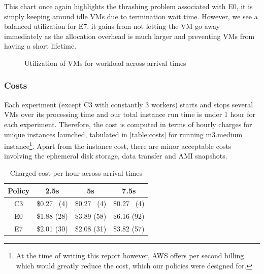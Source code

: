 \documentclass[a4paper]{IEEEtran}
\begin{document}
This chart once again highlights the thrashing problem associated with \textsc{E0}, it is simply keeping around idle VMs due to termination wait time. However, we see a balanced utilization for \textsc{E7}, it gains from not letting the VM go away immediately as the allocation overhead is much larger and preventing VMs from having a short lifetime.

\begin{figure}[tbp]
  \caption{Utilization of VMs for workload across arrival times}
  \label{fig:utilization}
\end{figure}

\subsubsection{Costs}

Each experiment (except C3 with constantly 3 workers) starts and stops several VMs over its processing time and our total instance run time is under 1 hour for each experiment. Therefore, the cost is computed in terms of hourly charges for unique instances launched, tabulated in \autoref{table:costs} for running m3.medium instance\footnote{At the time of writing this report however, AWS offers per second billing which would greatly reduce the cost, which our policies were designed for.}. Apart from the instance cost, there are minor acceptable costs involving the ephemeral disk storage, data transfer and AMI snapshots.

\begin{table}[hbp]
  \centering
  \caption{Charged cost per hour across arrival times}
  \label{table:costs}
  \begin{tabular}{|c|c|c|c|}
    \hline
    Policy & 2.5s & 5s & 7.5s \\
    \hline
    C3 & \$0.27 ~(4) & \$0.27 ~(4) & \$0.27 ~(4) \\
    E0 & \$1.88 (28) & \$3.89 (58) & \$6.16 (92) \\
    E7 & \$2.01 (30) & \$2.08 (31) & \$3.82 (57) \\
    \hline
  \end{tabular}
\end{table}
\end{document}
